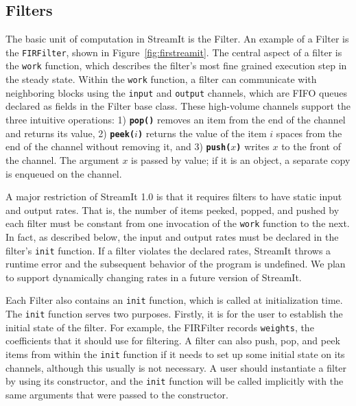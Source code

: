 \subsection{Filters}

The basic unit of computation in StreamIt is the Filter.  An example of
a Filter is the {\tt FIRFilter}, shown in Figure~\ref{fig:firstreamit}.  The central
aspect of a filter is the {\tt work} function, which describes the
filter's most fine grained execution step in the steady state.  Within
the {\tt work} function, a filter can communicate with neighboring
blocks using the {\tt input} and {\tt output} channels, which are FIFO
queues declared as fields in the Filter base class.  These high-volume
channels support the three intuitive operations: 1) {\bf {\tt pop()}}
removes an item from the end of the channel and returns its value, 2)
{\bf {\tt peek($i$)}} returns the value of the item $i$ spaces from the
end of the channel without removing it, and 3) {\bf {\tt push($x$)}}
writes $x$ to the front of the channel.  The argument $x$ is passed by
value; if it is an object, a separate copy is enqueued on the channel.

A major restriction of StreamIt 1.0 is that it requires filters to have
static input and output rates.  That is, the number of items peeked,
popped, and pushed by each filter must be constant from one invocation
of the {\tt work} function to the next.  In fact, as described below,
the input and output rates must be declared in the filter's {\tt init}
function.  If a filter violates the declared rates, StreamIt throws a
runtime error and the subsequent behavior of the program is
undefined. We plan to support dynamically changing rates in a future
version of StreamIt.

Each Filter also contains an {\tt init} function, which is called at
initialization time.  The {\tt init} function serves two purposes.
Firstly, it is for the user to establish the initial state of the
filter.  For example, the FIRFilter records {\tt weights}, the
coefficients that it should use for filtering.  A filter can also push,
pop, and peek items from within the {\tt init} function if it needs to
set up some initial state on its channels, although this usually is not
necessary.  A user should instantiate a filter by using its constructor,
and the {\tt init} function will be called implicitly with the same
arguments that were passed to the constructor.

